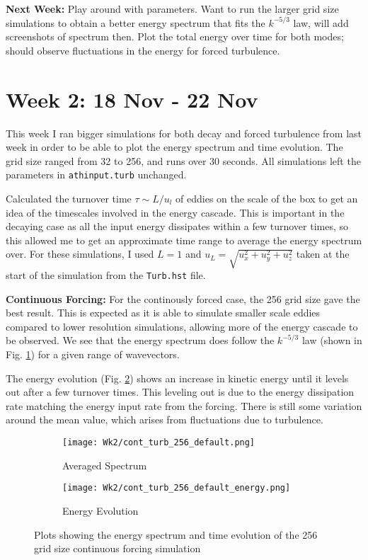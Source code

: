 \documentclass[12pt,letterpaper]{article}
\begin{document}
  \textbf{Next Week:} Play around with parameters. Want to run the larger grid size simulations to obtain a better energy spectrum that fits the $k^{-5/3}$ law, will add screenshots of spectrum then. Plot the total energy over time for both modes; should observe fluctuations in the energy for forced turbulence.


  \section*{Week 2: 18 Nov - 22 Nov}
  This week I ran bigger simulations for both decay and forced turbulence from last week in order to be able to plot the energy spectrum and time evolution. The grid size ranged from 32 to 256, and runs over 30 seconds. All simulations left the parameters in \verb|athinput.turb| unchanged.

  Calculated the turnover time $\tau \sim L/u_l$ of eddies on the scale of the box to get an idea of the timescales involved in the energy cascade. This is important in the decaying case as all the input energy dissipates within a few turnover times, so this allowed me to get an approximate time range to average the energy spectrum over. For these simulations, I used $L=1$ and $u_L = \sqrt{u^2_x+u^2_y+u^2_z}$ taken at the start of the simulation from the \verb|Turb.hst| file.

  \textbf{Continuous Forcing:} For the continously forced case, the 256 grid size gave the best result. This is expected as it is able to simulate smaller scale eddies compared to lower resolution simulations, allowing more of the energy cascade to be observed. We see that the energy spectrum does follow the $k^{-5/3}$ law (shown in Fig. \ref{fig:256contspec}) for a given range of wavevectors.

  The energy evolution (Fig. \ref{fig:256conteng}) shows an increase in kinetic energy until it levels out after a few turnover times. This leveling out is due to the energy dissipation rate matching the energy input rate from the forcing. There is still some variation around the mean value, which arises from fluctuations due to turbulence.

  \begin{figure}[!h]
   \centering
  \begin{subfigure}{.5\textwidth}
    \centering
  \texttt{[image: Wk2/cont\_turb\_256\_default.png]}
  \caption{Averaged Spectrum}
  \label{fig:256contspec}
  \end{subfigure}
  \begin{subfigure}{.5\textwidth}
    \centering
  \texttt{[image: Wk2/cont\_turb\_256\_default\_energy.png]}
  \caption{Energy Evolution}
  \label{fig:256conteng}
  \end{subfigure}

  \caption{Plots showing the energy spectrum and time evolution of the 256 grid size continuous forcing simulation}
  \label{fig:256contenergy}
  \end{figure}
\end{document}
